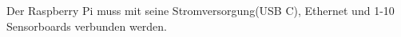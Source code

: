 \section{}
Der Raspberry Pi muss mit seine Stromversorgung(USB C), Ethernet und 1-10 Sensorboards verbunden werden.